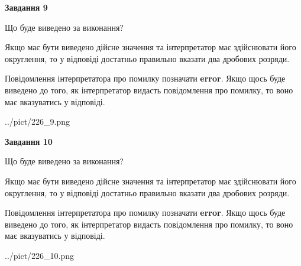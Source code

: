 \documentclass[12pt, ukrainian]{article}
\begin{document}
{\begin {Large}
{\begin {center}\textbf{Завдання 9}\end {center}}\par
Що буде виведено за виконання? \par

Якщо має бути виведено дійсне значення та інтерпретатор має здійснювати його округлення, 
то у відповіді достатньо правильно вказати два дробових розряди.

Повідомлення інтерпретатора про помилку позначати \textbf{error}.
Якщо щось буде виведено до того, як інтерпретатор видасть повідомлення про помилку, 
то воно має вказуватись у відповіді. \par

\begin{center}
	{../pict/226_9.png}
\end{center}
\newpage

{\begin {center}\textbf{Завдання 10}\end {center}}\par
Що буде виведено за виконання? \par

Якщо має бути виведено дійсне значення та інтерпретатор має здійснювати його округлення, 
то у відповіді достатньо правильно вказати два дробових розряди.

Повідомлення інтерпретатора про помилку позначати \textbf{error}.
Якщо щось буде виведено до того, як інтерпретатор видасть повідомлення про помилку, 
то воно має вказуватись у відповіді. \par

\begin{center}
	{../pict/226_10.png}
\end{center}
\newpage

\end {Large}}
\end{document}

